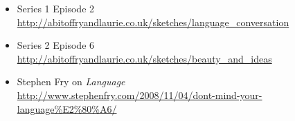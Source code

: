 \documentclass[headrule,footrule]{foils}
\begin{document}


\begin{itemize}
\item Series 1 Episode 2
\\ \url{http://abitoffryandlaurie.co.uk/sketches/language_conversation}
\item Series 2 Episode 6
\\ \url{http://abitoffryandlaurie.co.uk/sketches/beauty_and_ideas}
\item Stephen Fry on \textit{Language}
\\ \url{http://www.stephenfry.com/2008/11/04/dont-mind-your-language%E2%80%A6/}
\end{itemize}



\renewcommand{\section}[2]{}
\renewcommand{\baselinestretch}{0.9}
\small


\end{document}
